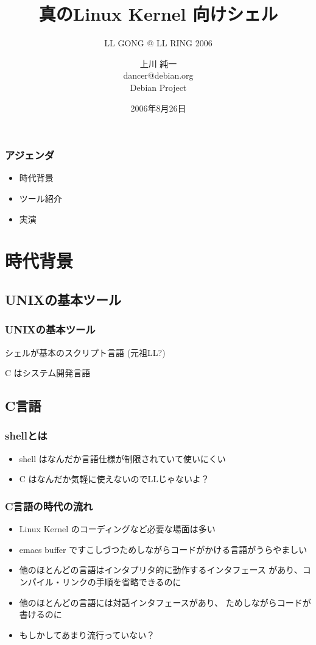 \documentclass[cjk,dvipdfmx,14pt]{beamer}
\title{真のLinux Kernel 向けシェル}
\subtitle{LL GONG @ LL RING 2006}
\author{上川 純一 \\dancer@debian.org\\ Debian Project}
\date{2006年8月26日}
\begin{document}
\frame{\titlepage{}}

\begin{frame}
\frametitle{アジェンダ}
\begin{center}
 \begin{minipage}{0.5\hsize}
 \begin{itemize}
 \item 時代背景
 \item ツール紹介
 \item 実演
 \end{itemize}
 \end{minipage}
\end{center}
\end{frame}

\section{時代背景}

\subsection{UNIXの基本ツール}
\begin{frame}
\frametitle{UNIXの基本ツール}

シェルが基本のスクリプト言語 (元祖LL?)

C はシステム開発言語

\end{frame}

\subsection{C言語}

\begin{frame}
\frametitle{shellとは}
\begin{itemize}[<+->]
 \item shell はなんだか言語仕様が制限されていて使いにくい
 \item C はなんだか気軽に使えないのでLLじゃないよ？
\end{itemize}
\end{frame}

\begin{frame}
\frametitle{C言語の時代の流れ}
 \begin{itemize}[<+->]
  \item Linux Kernel のコーディングなど必要な場面は多い
  \item emacs buffer ですこしづつためしながらコードがかける言語がうらやましい
  \item 他のほとんどの言語はインタプリタ的に動作するインタフェース
	があり、コンパイル・リンクの手順を省略できるのに
  \item 他のほとんどの言語には対話インタフェースがあり、
	ためしながらコードが書けるのに
  \item もしかしてあまり流行っていない？
 \end{itemize}
\end{frame}
\end{document}
